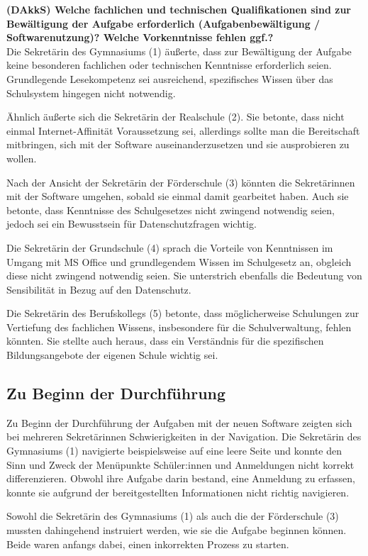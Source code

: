 \textbf{(DAkkS) Welche fachlichen und technischen Qualifikationen sind zur Bewältigung der Aufgabe erforderlich (Aufgabenbewältigung / Softwarenutzung)? Welche Vorkenntnisse fehlen ggf.?}\\
Die Sekretärin des Gymnasiums (1) äußerte, dass zur Bewältigung der Aufgabe keine besonderen fachlichen oder technischen Kenntnisse erforderlich seien. Grundlegende Lesekompetenz sei ausreichend, spezifisches Wissen über das Schulsystem hingegen nicht notwendig.

Ähnlich äußerte sich die Sekretärin der Realschule (2). Sie betonte, dass nicht einmal Internet-Affinität Voraussetzung sei, allerdings sollte man die Bereitschaft mitbringen, sich mit der Software auseinanderzusetzen und sie ausprobieren zu wollen.

Nach der Ansicht der Sekretärin der Förderschule (3) könnten die Sekretärinnen mit der Software umgehen, sobald sie einmal damit gearbeitet haben. Auch sie betonte, dass Kenntnisse des Schulgesetzes nicht zwingend notwendig seien, jedoch sei ein Bewusstsein für Datenschutzfragen wichtig.

Die Sekretärin der Grundschule (4) sprach die Vorteile von Kenntnissen im Umgang mit MS Office und grundlegendem Wissen im Schulgesetz an, obgleich diese nicht zwingend notwendig seien. Sie unterstrich ebenfalls die Bedeutung von Sensibilität in Bezug auf den Datenschutz.

Die Sekretärin des Berufskollegs (5) betonte, dass möglicherweise Schulungen zur Vertiefung des fachlichen Wissens, insbesondere für die Schulverwaltung, fehlen könnten. Sie stellte auch heraus, dass ein Verständnis für die spezifischen Bildungsangebote der eigenen Schule wichtig sei.


\subsection{Zu Beginn der Durchführung}
Zu Beginn der Durchführung der Aufgaben mit der neuen Software zeigten sich bei mehreren Sekretärinnen Schwierigkeiten in der Navigation. Die Sekretärin des Gymnasiums (1) navigierte beispielsweise auf eine leere Seite und konnte den Sinn und Zweck der Menüpunkte \glqq Schüler:innen\grqq{} und \glqq Anmeldungen\grqq{} nicht korrekt differenzieren. Obwohl ihre Aufgabe darin bestand, eine Anmeldung zu erfassen, konnte sie aufgrund der bereitgestellten Informationen nicht richtig navigieren.

Sowohl die Sekretärin des Gymnasiums (1) als auch die der Förderschule (3) mussten dahingehend instruiert werden, wie sie die Aufgabe beginnen können. Beide waren anfangs dabei, einen inkorrekten Prozess zu starten.

